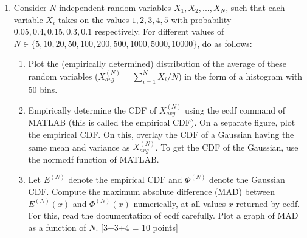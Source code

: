 \documentclass[11pt]{article}
\begin{document}
\begin{enumerate}
\item Consider $N$ independent random variables $X_1, X_2,...,X_N$, such that each variable $X_i$ takes on the values $1,2,3,4,5$ with probability $0.05, 0.4, 0.15, 0.3, 0.1$ respectively. For different values of \\
$N \in \{5,10,20,50,100,200,500,1000,5000,10000\}$, do as follows:
\begin{enumerate}
\item Plot the (empirically determined) distribution of the average of these random variables ($X^{(N)}_{avg} = \sum_{i=1}^N X_i/N$) in the form of a histogram with 50 bins. 
\item Empirically determine the CDF of  $X^{(N)}_{avg}$ using the \textsf{ecdf} command of MATLAB (this is called the empirical CDF). On a separate figure, plot the empirical CDF. On this, overlay the CDF of a Gaussian having the same mean and variance as $X^{(N)}_{avg}$. To get the CDF of the Gaussian, use the \textsf{normcdf} function of MATLAB. 
\item Let $E^{(N)}$ denote the empirical CDF and $\Phi^{(N)}$ denote the Gaussian CDF. Compute the maximum absolute difference (MAD) between $E^{(N)}(x)$ and $\Phi^{(N)}(x)$ numerically, at all values $x$ returned by \textsf{ecdf}. For this, read the documentation of \textsf{ecdf} carefully. Plot a graph of MAD as a function of $N$. \textsf{[3+3+4 = 10 points]} 
\end{enumerate}


\end{enumerate}
\end{document}

